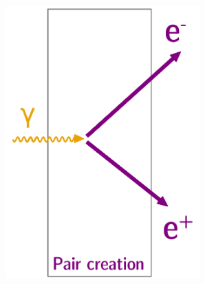 \begin{figure}[!h]
\centering
\begin{subfigure}[t]{0.32\textwidth}
  \centering
  \includegraphics[width=0.82\textwidth]{SNdemonstrator/fig_SNdemonstrator/external_contamination_pair.pdf}
  \captionsetup{justification=justified}
  \caption{
    \label{subfig:ext_cont_pair}}
\end{subfigure}
\hfill
\begin{subfigure}[t]{0.32\textwidth}
  \centering

\end{subfigure}
\end{figure}
